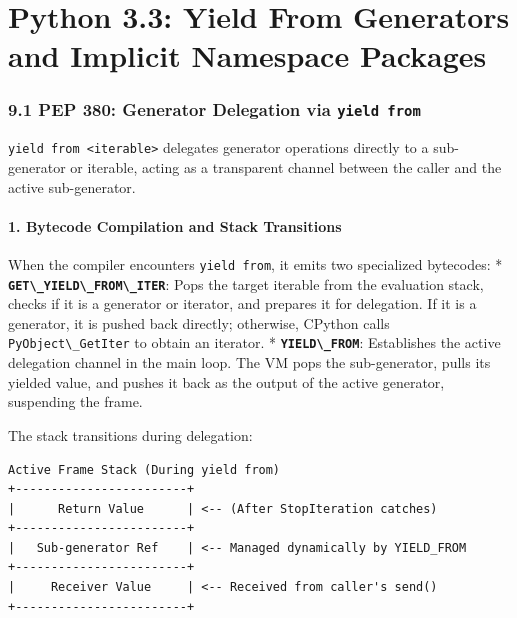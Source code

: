 \hypertarget{python-3.3-yield-from-generators-and-implicit-namespace-packages}{%
\chapter{Python 3.3: Yield From Generators and Implicit Namespace
Packages}\label{python-3.3-yield-from-generators-and-implicit-namespace-packages}}

\hypertarget{pep-380-generator-delegation-via-yield-from}{%
\subsection{\texorpdfstring{9.1 PEP 380: Generator Delegation via
\texttt{yield\ from}}{9.1 PEP 380: Generator Delegation via yield from}}\label{pep-380-generator-delegation-via-yield-from}}

\passthrough{\lstinline!yield from <iterable>!} delegates generator
operations directly to a sub-generator or iterable, acting as a
transparent channel between the caller and the active sub-generator.

\hypertarget{bytecode-compilation-and-stack-transitions}{%
\subsubsection{1. Bytecode Compilation and Stack
Transitions}\label{bytecode-compilation-and-stack-transitions}}

When the compiler encounters \passthrough{\lstinline!yield from!}, it
emits two specialized bytecodes: *
\textbf{\passthrough{\lstinline!GET\_YIELD\_FROM\_ITER!}}: Pops the
target iterable from the evaluation stack, checks if it is a generator
or iterator, and prepares it for delegation. If it is a generator, it is
pushed back directly; otherwise, CPython calls
\passthrough{\lstinline!PyObject\_GetIter!} to obtain an iterator. *
\textbf{\passthrough{\lstinline!YIELD\_FROM!}}: Establishes the active
delegation channel in the main loop. The VM pops the sub-generator,
pulls its yielded value, and pushes it back as the output of the active
generator, suspending the frame.

The stack transitions during delegation:

\begin{lstlisting}
Active Frame Stack (During yield from)
+------------------------+
|      Return Value      | <-- (After StopIteration catches)
+------------------------+
|   Sub-generator Ref    | <-- Managed dynamically by YIELD_FROM
+------------------------+
|     Receiver Value     | <-- Received from caller's send()
+------------------------+
\end{lstlisting}

